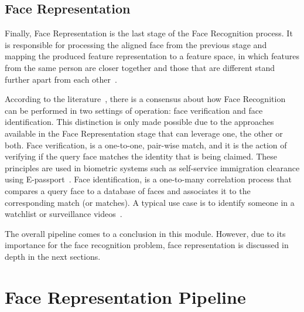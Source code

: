 \documentclass[class=report, crop=false, a4paper, 12pt]{standalone}
\begin{document}
\subsection{Face Representation}
\par Finally, Face Representation is the last stage of the Face Recognition process. It is responsible for processing the aligned face from the previous stage and mapping the produced feature representation to a feature space, in which features from the same person are closer together and those that are different stand further apart from each other~\autocite{duElementsEndtoendDeep2022}.
\par According to the literature~\autocite{duElementsEndtoendDeep2022,liHandbookFaceRecognition2011,ranjanDeepLearningUnderstanding2018,schroffFaceNetUnifiedEmbedding2015,wangDeepFaceRecognition2021}, there is a consensus about how Face Recognition can be performed in two settings of operation: face verification and face identification. This distinction is only made possible due to the approaches available in the Face Representation stage that can leverage one, the other or both. Face verification, is a one-to-one, pair-wise match, and it is the action of verifying if the query face matches the identity that is being claimed. These principles are used in biometric systems such as self-service immigration clearance using E-passport~\autocite{liHandbookFaceRecognition2011}. Face identification, is a one-to-many correlation process that compares a query face to a database of faces and associates it to the corresponding match (or matches). A typical use case is to identify someone in a watchlist or surveillance videos~\autocite{liHandbookFaceRecognition2011}.



\vspace{0.7\baselineskip}
\par The overall pipeline comes to a conclusion in this module. However, due to its importance for the face recognition problem, face representation is discussed in depth in the next sections.

\section{Face Representation Pipeline}

\end{document}
